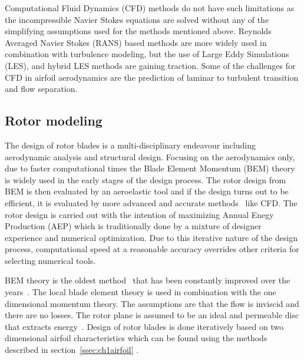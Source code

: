 Computational Fluid Dynamics (CFD) methods do not have such limitations as the incompressible Navier Stokes equations are solved without any of the simplifying assumptions used for the methods mentioned above. Reynolds Averaged Navier Stokes (RANS) based methods are more widely used in combination with turbulence modeling, but the use of Large Eddy Simulations (LES), and hybrid LES methods are gaining traction. Some of the challenges for CFD in airfoil aerodynamics are the prediction of laminar to turbulent transition and flow separation.



\subsection{Rotor modeling}
The design of rotor blades is a multi-disciplinary endeavour including aerodynamic analysis and structural design. Focusing on the aerodynamics only, due to faster computational times the Blade Element Momentum (BEM) theory is widely used in the early stages of the design process. The rotor design from BEM is then evaluated by an aeroelastic tool and if the design turns out to be efficient, it is evaluated by more advanced and accurate methods~\cite{bak2011aerodynamic} like CFD. The rotor design is carried out with the intention of maximizing Annual Enegy Production (AEP) which is traditionally done by a mixture of designer experience and numerical optimization. Due to this iterative nature of the design process, computational speed at a reasonable accuracy overrides other criteria for selecting numerical tools. 

BEM theory is the oldest method~\cite{windenergyexp, bak2011aerodynamic} that has been constantly improved over the years~\cite{Gerardthesis}. The local blade element theory is used in combination with the one dimensional momentum theory. The assumptions are that the flow is inviscid and there are no losses. The rotor plane is assumed to be an ideal and permeable disc that extracts energy~\cite{windenergyexp, bak2011aerodynamic}. Design of rotor blades is done iteratively based on two dimensional airfoil characteristics which can be found using the methods described in section~\ref{ssec:ch1airfoil} .

